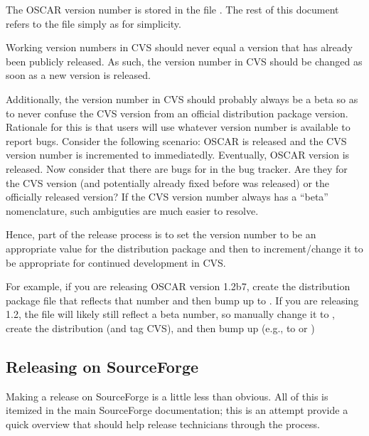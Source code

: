 The OSCAR version number is stored in the file .
The rest of this document refers to the file simply as 
for simplicity.

Working version numbers in CVS should never equal a version that has
already been publicly released.  As such, the version number in CVS
should be changed as soon as a new version is released.

Additionally, the version number in CVS should probably always be a
beta so as to never confuse the CVS version from an official
distribution package version.  Rationale for this is that users will
use whatever version number is available to report bugs.  Consider the
following scenario: OSCAR  is released and the CVS
version number is incremented to  immediatedly.
Eventually, OSCAR version  is released.  Now consider
that there are bugs for  in the bug tracker.  Are
they for the CVS version (and potentially already fixed before
 was released) or the officially released version?
If the CVS version number always has a ``beta'' nomenclature, such
ambiguties are much easier to resolve.

Hence, part of the release process is to set the version number to be
an appropriate value for the distribution package and then to
increment/change it to be appropriate for continued development in
CVS.
    
For example, if you are releasing OSCAR version 1.2b7, create the
distribution package file that reflects that number and then bump up
 to .  If you are releasing 1.2, the
 file will likely still reflect a beta number, so
manually change it to , create the distribution (and tag
CVS), and then bump up  (e.g., to  or
)
    

\subsection{Releasing on SourceForge}

Making a release on SourceForge is a little less than obvious.  All of
this is itemized in the main SourceForge documentation; this is an
attempt provide a quick overview that should help release technicians
through the process.

